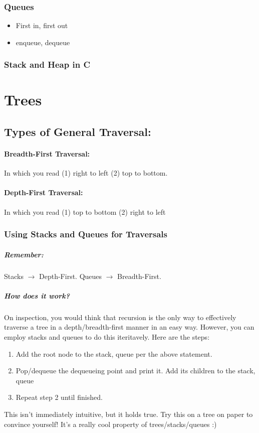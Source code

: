 \documentclass[a4paper,12pt]{report}
\begin{document}
\subsection{Queues}
\begin{itemize}
\item First in, first out
\item enqueue, dequeue
\end{itemize}

\subsection{Stack and Heap in C}


\chapter{Trees}
\section{Types of General Traversal:}
\subsubsection{Breadth-First Traversal: }
In which you read (1) right to left (2) top to bottom.
\subsubsection{Depth-First Traversal: }
In which you read (1) top to bottom (2) right to left

\subsection{Using Stacks and Queues for Traversals}
\paragraph{Remember: } Stacks $\to$ Depth-First. Queues $\to$ Breadth-First. 
\paragraph{How does it work?}
On inspection, you would think that recursion is the only way to effectively traverse a tree in a depth/breadth-first manner in an easy way. However, you can employ stacks and queues to do this iteritavely. Here are the steps:
\begin{enumerate}
\item Add the root node to the {stack, queue} per the above statement.
\item Pop/dequeue the dequeueing point and print it. Add its children to the {stack, queue}
\item Repeat step 2 until finished. 
\end{enumerate}
This isn't immediately intuitive, but it holds true. Try this on a tree on paper to convince yourself! It's a really cool property of trees/stacks/queues :)
\end{document}
